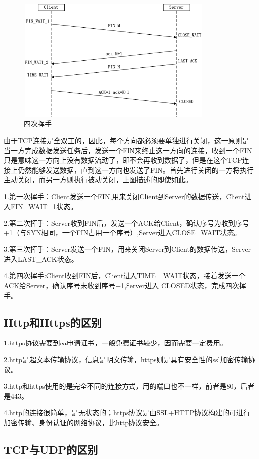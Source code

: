 \documentclass[UTF8]{ctexart}
\begin{document}
\begin{figure}[htbp]
\centering
\includegraphics[height=6.0cm,width=9.5cm]{Figure/four.png}
\caption{四次挥手}
\end{figure}

由于TCP连接是全双工的，因此，每个方向都必须要单独进行关闭，这一原则是当一方完成数据发送任务后，发送一个FIN来终止这一方向的连接，收到一个FIN只是意味这一方向上没有数据流动了，即不会再收到数据了，但是在这个TCP连接上仍然能够发送数据，直到这一方向也发送了FIN。首先进行关闭的一方将执行主动关闭，而另一方则执行被动关闭，上图描述的即使如此。

1.第一次挥手：Client发送一个FIN,用来关闭Client到Server的数据传送，Client进入FIN\_WAIT\_1状态。

2.第二次挥手：Server收到FIN后，发送一个ACK给Client，确认序号为收到序号+1（与SYN相同，一个FIN占用一个序号）,Server进入CLOSE\_WAIT状态。

3.第三次挥手：Server发送一个FIN，用来关闭Server到Client的数据传送，Server进入LAST\_ACK状态。

4.第四次挥手:Client收到FIN后，Client进入TIME \_WAIT状态，接着发送一个ACK给Server，确认序号未收到序号+1,Server进入
CLOSED状态，完成四次挥手。


\subsection{Http和Https的区别}

1.https协议需要到ca申请证书，一般免费证书较少，因而需要一定费用。

2.http是超文本传输协议，信息是明文传输，https则是具有安全性的ssl加密传输协议。

3.http和https使用的是完全不同的连接方式，用的端口也不一样，前者是80，后者是443。

4.http的连接很简单，是无状态的；https协议是由SSL+HTTP协议构建的可进行加密传输、身份认证的网络协议，比http协议安全。

\subsection{TCP与UDP的区别}
\end{document}
